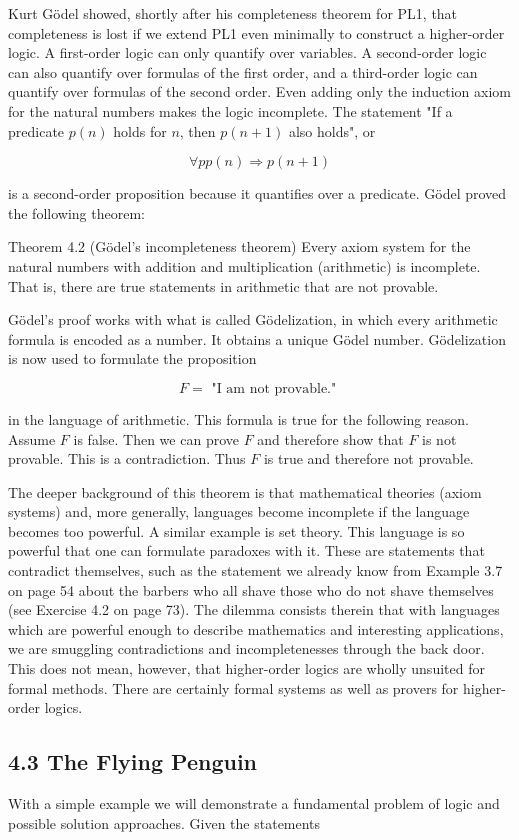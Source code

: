 \documentclass[10pt]{article}
\begin{document}
Kurt Gödel showed, shortly after his completeness theorem for PL1, that completeness is lost if we extend PL1 even minimally to construct a higher-order logic. A first-order logic can only quantify over variables. A second-order logic can also quantify over formulas of the first order, and a third-order logic can quantify over formulas of the second order. Even adding only the induction axiom for the natural numbers makes the logic incomplete. The statement "If a predicate $p(n)$ holds for $n$, then $p(n+1)$ also holds", or

$$
\forall p p(n) \Rightarrow p(n+1)
$$

is a second-order proposition because it quantifies over a predicate. Gödel proved the following theorem:

Theorem 4.2 (Gödel's incompleteness theorem) Every axiom system for the natural numbers with addition and multiplication (arithmetic) is incomplete. That is, there are true statements in arithmetic that are not provable.

Gödel's proof works with what is called Gödelization, in which every arithmetic formula is encoded as a number. It obtains a unique Gödel number. Gödelization is now used to formulate the proposition

$$
F=\text { "I am not provable." }
$$

in the language of arithmetic. This formula is true for the following reason. Assume $F$ is false. Then we can prove $F$ and therefore show that $F$ is not provable. This is a contradiction. Thus $F$ is true and therefore not provable.

The deeper background of this theorem is that mathematical theories (axiom systems) and, more generally, languages become incomplete if the language becomes too powerful. A similar example is set theory. This language is so powerful that one can formulate paradoxes with it. These are statements that contradict themselves, such as the statement we already know from Example 3.7 on page 54 about the barbers who all shave those who do not shave themselves (see Exercise 4.2 on page 73). The dilemma consists therein that with languages which are powerful enough to describe mathematics and interesting applications, we are smuggling contradictions and incompletenesses through the back door. This does not mean, however, that higher-order logics are wholly unsuited for formal methods. There are certainly formal systems as well as provers for higher-order logics.

\subsection*{4.3 The Flying Penguin}
With a simple example we will demonstrate a fundamental problem of logic and possible solution approaches. Given the statements
\end{document}
